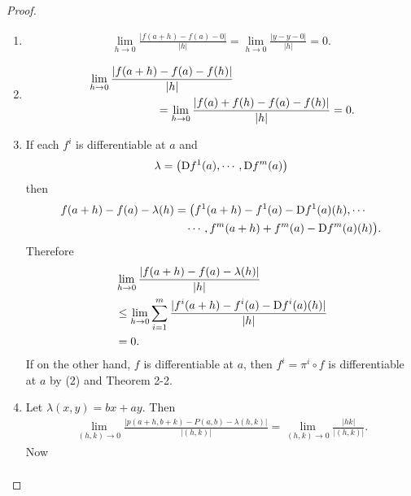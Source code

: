 \begin{proof}
    \begin{enumerate}[label={\upshape(\arabic*)}]
        \item 
            \begin{align*}
                \lim_{h\to0}\frac{\left|f(a+h)-f(a)-0\right|}{|h|}=\lim_{h\to0}\frac{|y-y-0|}{|h|}=0.        
            \end{align*}
        \item 
            \begin{align*}
                &\lim_{h\to0}\frac{\left|f(a+h)-f(a)-f(h)\right|}{|h|} \\
                &\hspace*{6em} = \lim_{h\to0}\frac{|f(a) + f(h) - f(a) - f(h)|}{|h|}=0.
            \end{align*}
        \item If each $f^i$ is differentiable at $a$ and
            \begin{align*}
                \lambda = \left(\mathrm{D}f^1(a), \cdots, \mathrm{D}f^m(a)\right)
            \end{align*}
            then 
            \begin{align*}
                f(a+h) - f(a) -\lambda(h) 
                & = \big(f^1(a+h) - f^1(a) - \mathrm{D}f^1(a)(h), \cdots \\
                & \quad\cdots,f^m(a+h) + f^m(a) - \mathrm{D}f^m(a)(h)\big). 
            \end{align*}
            Therefore 
            \begin{align*}
                & \lim_{h\to 0}{\frac{|f(a+h) - f(a) - \lambda(h)|}{|h|}} \\
                & \le \lim_{h\to 0}{\sum_{i=1 }^{m}{\frac{\displaystyle |f^i(a+h) - f^i(a) - \mathrm{D}f^i(a)(h)|}{|h|}}} \\
                & = 0.
            \end{align*}
            If on the other hand, $f$ is differentiable at $a$, then $f^i = \pi^i\circ f$ is differentiable at $a$ 
            by (2) and Theorem 2-2.
        \item Let $\lambda(x, y) = bx + ay$. Then 
            \begin{align*}
                \lim_{(h, k)\to 0}{\frac{|p(a+h, b+k) - P(a, b) - \lambda(h, k)|}{|(h, k)|}} 
                = \lim_{(h, k)\to 0}{\frac{|hk|}{|(h, k)|}}.
            \end{align*}
            Now 
            \begin{align*}

\end{align*}
\end{enumerate}
\end{proof}
